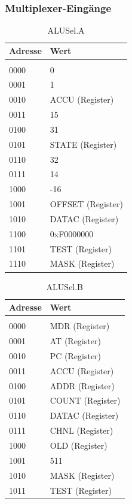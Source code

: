 \documentclass[12pt,titlepage]{article}
\begin{document}
\leavevmode \\

\subsubsection{Multiplexer-Eingänge}

\begin{table}[h!]
    \begin{tabular}{l|l}
    Adresse & Wert              \\
    \hline  					\\
    0000     & 0                 \\
    0001     & 1                 \\
    0010     & ACCU (Register)   \\
    0011     & 15                \\
    0100     & 31                \\
    0101     & STATE (Register)  \\
    0110     & 32                \\
    0111     & 14                \\
    1000     & -16               \\
    1001     & OFFSET (Register) \\
    1010     & DATAC (Register)  \\
    1100     & 0xF0000000        \\
    1101     & TEST (Register)   \\
    1110     & MASK (Register)   \\
    \end{tabular}
    \caption{ALUSel.A}
\end{table}

\begin{table}[h!]
    \begin{tabular}{l|l}
    Adresse & Wert            \\
    \hline                    \\
    0000     & MDR (Register)  \\
    0001     & AT (Register)   \\
    0010     & PC (Register)   \\
    0011     & ACCU (Register) \\
    0100     & ADDR (Register) \\
    0101     & COUNT (Register) \\
    0110     & DATAC (Register) \\
    0111     & CHNL (Register) \\
    1000     & OLD (Register)  \\
    1001     & 511             \\
    1010     & MASK (Register) \\
    1011     & TEST (Register) \\
    \end{tabular}
    \caption{ALUSel.B}
\end{table}
\end{document}
